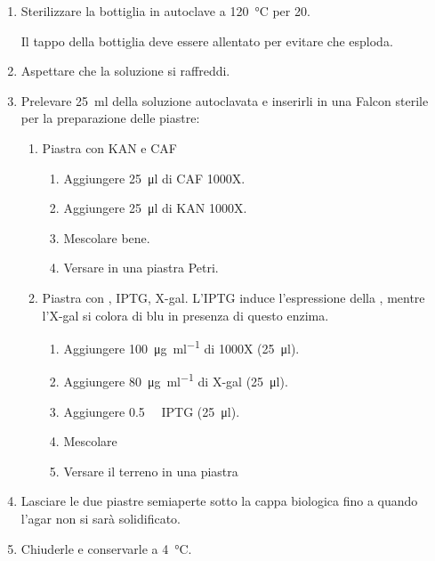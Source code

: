 \begin{enumerate}
	\item Sterilizzare la bottiglia in autoclave a \qty{120}{\celsius}  per \qty{20}{\min}.
	\begin{Attenzione}
		Il tappo della bottiglia deve essere allentato per evitare che esploda.
	\end{Attenzione}
	\item Aspettare che la soluzione si raffreddi.
	\item Prelevare \qty{25}{\ml} della soluzione autoclavata e inserirli in una Falcon sterile per la preparazione delle piastre:
	\begin{enumerate}[label=\Alph*)]
		\item Piastra con \gls{KAN} e \gls{CAF}
		\begin{enumerate}[label=\arabic*.]
			\item Aggiungere \qty{25}{\micro\litre} di \gls{CAF} 1000X.
			\item Aggiungere \qty{25}{\micro\litre} di \gls{KAN} 1000X.
			\item Mescolare bene.
			\item Versare in una piastra Petri.
		\end{enumerate}
		\item Piastra con , \gls{IPTG}, \gls{X-gal}. L’IPTG induce l’espressione della , mentre l’\gls{X-gal} si colora di blu in presenza di questo enzima.
		\begin{enumerate}[label=\arabic*.]
			\item Aggiungere \qty{100}{\ug\per\ml} di  1000X (\qty{25}{\micro\litre}).
			\item Aggiungere \qty{80}{\ug\per\ml} di \gls{X-gal} (\qty{25}{\micro\litre}).
			\item Aggiungere \qty{0.5}{\milli\Molar} \gls{IPTG} (\qty{25}{\micro\litre}).
			\item Mescolare
			\item Versare il terreno in una piastra
		\end{enumerate}
	\end{enumerate}
	\item Lasciare le due piastre semiaperte sotto la cappa biologica fino a quando l’agar non si sarà solidificato.
	\item Chiuderle e conservarle a \qty{4}{\celsius}.
\end{enumerate}

